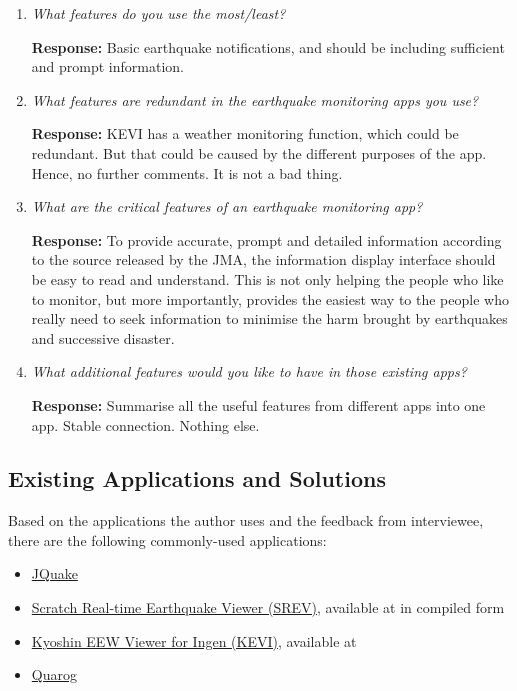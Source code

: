 \begin{enumerate}
    \item \textit{What features do you use the most/least?}

          \textbf{Response:} Basic earthquake notifications, and should be including sufficient and prompt information.

    \item \textit{What features are redundant in the earthquake monitoring apps you use?}

          \textbf{Response:} KEVI has a weather monitoring function, which could be redundant. But that could be caused by the different purposes of the app. Hence, no further comments. It is not a bad thing.

    \item \textit{What are the critical features of an earthquake monitoring app?}

          \textbf{Response:} To provide accurate, prompt and detailed information according to the source released by the JMA, the information display interface should be easy to read and understand. This is not only helping the people who like to monitor, but more importantly, provides the easiest way to the people who really need to seek information to minimise the harm brought by earthquakes and successive disaster.

    \item \textit{What additional features would you like to have in those existing apps?}

          \textbf{Response:} Summarise all the useful features from different apps into one app. Stable connection. Nothing else.
\end{enumerate}

\subsection{Existing Applications and Solutions}

Based on the applications the author uses and the feedback from interviewee, there are the following commonly-used applications:
\begin{itemize}
    \item \href{https://jquake.net}{JQuake}
    \item \href{https://kotoho7.github.io/scratch-realtime-earthquake-viewer-page/}{Scratch Real-time Earthquake Viewer (SREV)}, available at  in compiled form
    \item \href{https://svs.ingen084.net/kyoshineewviewer/}{Kyoshin EEW Viewer for Ingen (KEVI)}, available at 
    \item \href{https://fuku1213.github.io/quarog-site/}{Quarog}
\end{itemize}

